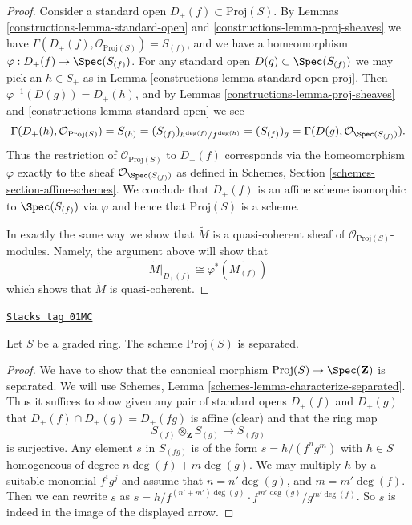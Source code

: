 \begin{proof}

Consider a standard open $D_{+}(f) \subset \text{Proj}(S)$.
By Lemmas \ref{constructions-lemma-standard-open} and \ref{constructions-lemma-proj-sheaves}
we have $\Gamma(D_{+}(f), \mathcal{O}_{\text{Proj}(S)}) = S_{(f)}$, and
we have a homeomorphism $\varphi : D_{+}(f) \to \Spec(S_{(f)})$.
For any standard open $D(g) \subset \Spec(S_{(f)})$ we may
pick an $h \in S_{+}$ as in Lemma \ref{constructions-lemma-standard-open-proj}.
Then $\varphi^{-1}(D(g)) = D_{+}(h)$, and by
Lemmas \ref{constructions-lemma-proj-sheaves} and \ref{constructions-lemma-standard-open} we see
$$
\Gamma(D_{+}(h), \mathcal{O}_{\text{Proj}(S)})
=
S_{(h)}
=
(S_{(f)})_{h^{\deg(f)}/f^{\deg(h)}}
=
(S_{(f)})_g
=
\Gamma(D(g), \mathcal{O}_{\Spec(S_{(f)})}).
$$
Thus the restriction of $\mathcal{O}_{\text{Proj}(S)}$ to
$D_{+}(f)$ corresponds via the homeomorphism $\varphi$
exactly to the sheaf $\mathcal{O}_{\Spec(S_{(f)})}$
as defined in Schemes, Section \ref{schemes-section-affine-schemes}.
We conclude that $D_{+}(f)$ is an affine scheme isomorphic to
$\Spec(S_{(f)})$ via $\varphi$ and
hence that $\text{Proj}(S)$ is a scheme.

\medskip\noindent
In exactly the same way we show that $\widetilde M$ is a
quasi-coherent sheaf of $\mathcal{O}_{\text{Proj}(S)}$-modules.
Namely, the argument above will show that
$$
\widetilde M|_{D_{+}(f)} \cong \varphi^*\left(\widetilde{M_{(f)}}\right)
$$
which shows that $\widetilde M$ is quasi-coherent.
\end{proof}

\begin{lemma}
\label{constructions-lemma-proj-separated}
\href{https://stacks.math.columbia.edu/tag/01MC}{\texttt{Stacks tag 01MC}}

Let $S$ be a graded ring.
The scheme $\text{Proj}(S)$ is separated.
\end{lemma}

\begin{proof}
We have to show that the canonical morphism
$\text{Proj}(S) \to \Spec(\mathbf{Z})$
is separated.
We will use Schemes, Lemma \ref{schemes-lemma-characterize-separated}.
Thus it suffices to show given any pair of standard opens
$D_{+}(f)$ and $D_{+}(g)$ that $D_{+}(f) \cap D_{+}(g) = D_{+}(fg)$
is affine (clear) and that the ring map
$$
S_{(f)} \otimes_{\mathbf{Z}} S_{(g)} \longrightarrow S_{(fg)}
$$
is surjective. Any element $s$ in $S_{(fg)}$ is of
the form $s = h/(f^ng^m)$ with $h \in S$ homogeneous of degree
$n\deg(f) + m\deg(g)$. We may multiply $h$ by a suitable
monomial $f^ig^j$ and assume that $n = n' \deg(g)$, and
$m = m' \deg(f)$. Then we can rewrite $s$ as
$s = h/f^{(n' + m')\deg(g)} \cdot f^{m'\deg(g)}/g^{m'\deg(f)}$.
So $s$ is indeed in the image of the displayed arrow.
\end{proof}

